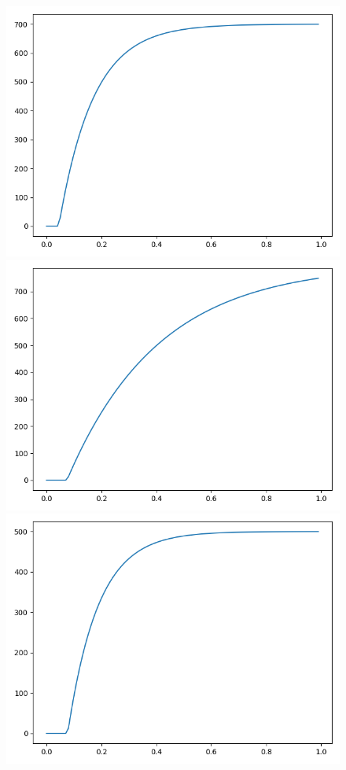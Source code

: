 \begin{figure}[!htb]
	\centering

  		\includegraphics[width=\linewidth]{images/phase0.png}
	\endminipage\hfill
  		\includegraphics[width=\linewidth]{images/phase1.png}
	\endminipage\hfill
  		\includegraphics[width=\linewidth]{images/phase2.png}
	\endminipage\hfill
	

\end{figure}
